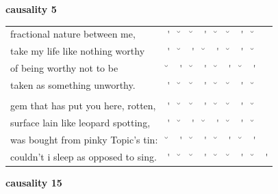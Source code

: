 \documentclass[12pt, landscape]{article}
\begin{document}
\vspace*{\fill}

\noindent \textbf{causality 5}
\noindent \hfill \par

\begin{center}
\begin{tabularx}{\textwidth}{
>{\lefting\arraybackslash}X
c
c
c
c
c
c
c
c
c
}

fractional nature between me, & \'{} & \u{} & \u{} & \'{} & \u{} & \u{} & \'{} & \u{} & \\
take my life like nothing worthy & \'{} & \u{} & \'{} & \u{} & \'{} & \u{} & \'{} & \u{} & \\
of being worthy not to be & \u{} & \'{} & \u{} & \'{} & \u{} & \'{} & \u{} & \'{} & \\
taken as something unworthy. & \'{} & \u{} & \u{} & \'{} & \u{} & \u{} & \'{} & \u{} & \\
 & & & & & & & & \\
gem that has put you here, rotten, & \'{} & \u{} & \u{} & \'{} & \u{} & \u{} & \'{} & \u{} & \\
surface lain like leopard spotting, & \'{} & \u{} & \'{} & \u{} & \'{} & \u{} & \'{} & \u{} & \\
was bought from pinky Topic's tin: & \u{} & \'{} & \u{} & \'{} & \u{} & \'{} & \u{} & \'{} & \\
couldn't i sleep as opposed to sing. & \'{} & \u{} & \u{} & \'{} & \u{} & \u{} & \'{} & \u{} & \'{} \\

\end{tabularx}
\end{center}

\vspace*{\fill}

\newpage

\vspace*{\fill}

\noindent \textbf{causality 15}
\noindent \hfill \par
\end{document}
